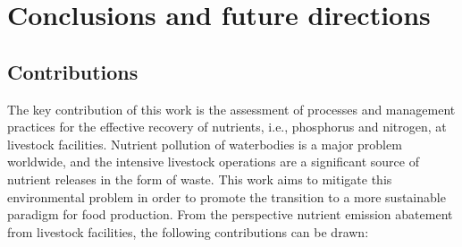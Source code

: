 \chapter{Conclusions and future directions}\label{ch:Conclusions}

\section{Contributions}
The key contribution of this work is the assessment of processes and management practices for the effective recovery of nutrients, i.e., phosphorus and nitrogen, at livestock facilities. Nutrient pollution of waterbodies is a major problem worldwide, and the intensive livestock operations are a significant source of nutrient releases in the form of waste. This work aims to mitigate this environmental problem in order to promote the transition to a more sustainable paradigm for food production. From the perspective nutrient emission abatement from livestock facilities, the following contributions can be drawn:

